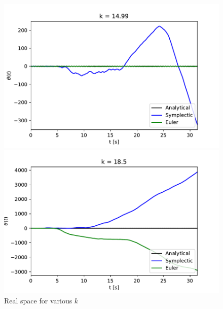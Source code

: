\begin{problem}{1}
\begin{figure}[ht!]
\begin{minipage}[b]{0.4\textwidth}
	  \includegraphics[scale=0.6]{../figures/k15_nonlin.pdf}
	\end{minipage}
	\hfill
	\begin{minipage}[b]{0.4\textwidth}
	  \includegraphics[scale=0.6]{../figures/k17_nonlin.pdf}
  \end{minipage}
	\caption{Real space for various $k$}
\end{figure}
\end{problem}

